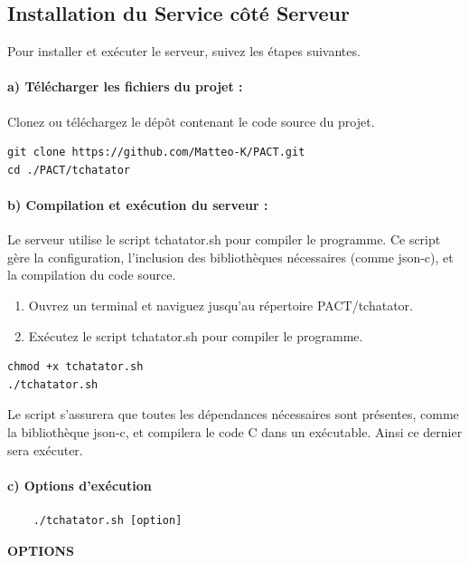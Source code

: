 \documentclass{report}
\begin{document}
\subsection{Installation du Service côté Serveur}

Pour installer et exécuter le serveur, suivez les étapes suivantes.

\paragraph{a) Télécharger les fichiers du projet :}

Clonez ou téléchargez le dépôt contenant le code source du projet.

\begin{verbatim}
git clone https://github.com/Matteo-K/PACT.git
cd ./PACT/tchatator
\end{verbatim}

\paragraph{b) Compilation et exécution du serveur :} Le serveur utilise le script tchatator.sh pour compiler le programme. Ce script gère la configuration, l'inclusion des bibliothèques nécessaires (comme json-c), et la compilation du code source.

\begin{enumerate}
	\item Ouvrez un terminal et naviguez jusqu'au répertoire PACT/tchatator.
	\item Exécutez le script tchatator.sh pour compiler le programme.
\end{enumerate}

\begin{verbatim}
chmod +x tchatator.sh
./tchatator.sh
\end{verbatim}

Le script s'assurera que toutes les dépendances nécessaires sont présentes, comme la bibliothèque json-c, et compilera le code C dans un exécutable. Ainsi ce dernier sera exécuter.

\paragraph{c) Options d'exécution}

\begin{verbatim}
	./tchatator.sh [option]
\end{verbatim}

\large \textbf{OPTIONS}
\end{document}
